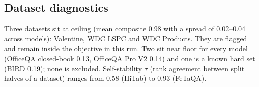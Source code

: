 \documentclass[11pt]{article}
\begin{document}
\subsection{Dataset diagnostics}
Three datasets sit at ceiling (mean composite 0.98 with a spread of 0.02--0.04 across models): Valentine, WDC LSPC and WDC Products. They are flagged and remain inside the objective in this run. Two sit near floor for every model (OfficeQA closed-book 0.13, OfficeQA Pro V2 0.14) and one is a known hard set (BIRD 0.19); none is excluded. Self-stability $\tau$ (rank agreement between split halves of a dataset) ranges from 0.58 (HiTab) to 0.93 (FeTaQA).

\end{document}
